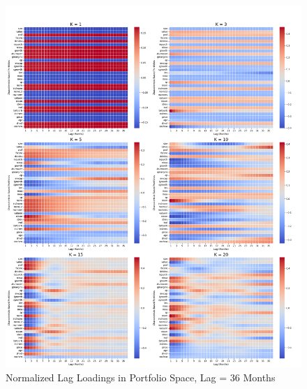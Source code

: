 \documentclass{article}
\begin{document}
\begin{figure}[H]
    \centering
    \includegraphics[width=1\linewidth]{WB_36_norm.png}
    \caption{Normalized Lag Loadings in Portfolio Space, Lag = 36 Months}
    \label{fig:WB_36_norm}
\end{figure}
\end{document}

